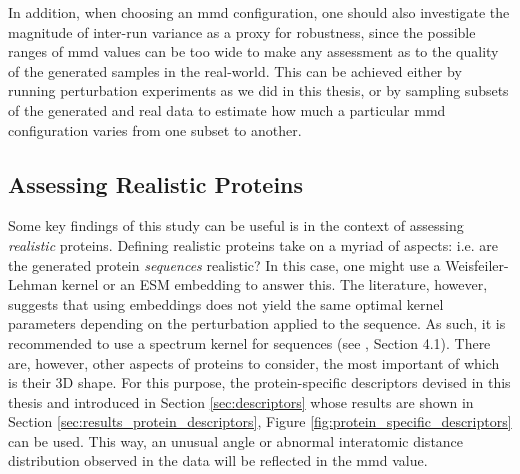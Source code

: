 In addition, when choosing an \gls{mmd} configuration, one should also
investigate the magnitude of inter-run variance as a proxy for robustness, since
the possible ranges of \gls{mmd} values can be too wide to make any
assessment as to the quality of the generated samples in the real-world. This
can be achieved either by running perturbation experiments as we did in this
thesis, or by sampling subsets of the generated and real data to estimate how
much a particular \gls{mmd} configuration varies from one subset to another.

\subsection{Assessing Realistic Proteins}\label{sec:discussion_realistic_proteins}

Some key findings of this study can be useful is in the context of assessing
\emph{realistic} proteins. Defining realistic proteins take on a myriad of
aspects: i.e. are the generated protein \emph{sequences} realistic? In this
case, one might use a Weisfeiler-Lehman kernel or an ESM embedding to answer
this. The literature, however, suggests that using embeddings does not yield the
same optimal kernel parameters depending on the perturbation applied to the
sequence. As such, it is recommended to use a spectrum kernel
\citep{leslie2002spectrum} for sequences (see \cite{kucera2022conditional},
Section 4.1). There are, however, other aspects of proteins to consider, the
most important of which is their 3D shape. For this purpose, the
protein-specific descriptors devised in this thesis and introduced in Section
\ref{sec:descriptors} whose results are shown in Section
\ref{sec:results_protein_descriptors}, Figure
\ref{fig:protein_specific_descriptors} can be used. This way, an unusual angle
or abnormal interatomic distance distribution observed in the data will be
reflected in the \gls{mmd} value.


